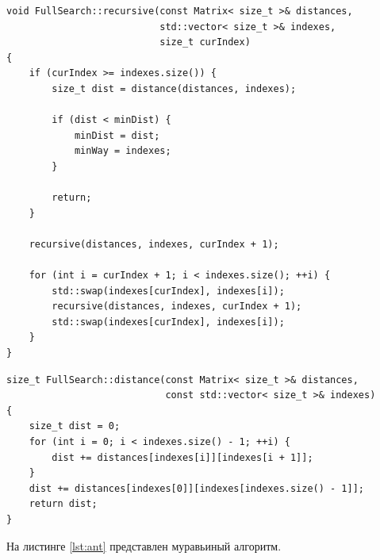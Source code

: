 \documentclass[a4paper,12pt]{article}
\begin{document}
\begin{lstlisting}[caption=Алгоритм рекурсивного перебора,label=lst:full]
void FullSearch::recursive(const Matrix< size_t >& distances,
                           std::vector< size_t >& indexes,
                           size_t curIndex)
{
    if (curIndex >= indexes.size()) {
        size_t dist = distance(distances, indexes);

        if (dist < minDist) {
            minDist = dist;
            minWay = indexes;
        }

        return;
    }

    recursive(distances, indexes, curIndex + 1);

    for (int i = curIndex + 1; i < indexes.size(); ++i) {
        std::swap(indexes[curIndex], indexes[i]);
        recursive(distances, indexes, curIndex + 1);
        std::swap(indexes[curIndex], indexes[i]);
    }
}
\end{lstlisting}

\begin{lstlisting}[caption=Подсчет пути,label=lst:dist]
size_t FullSearch::distance(const Matrix< size_t >& distances,
                            const std::vector< size_t >& indexes)
{
    size_t dist = 0;
    for (int i = 0; i < indexes.size() - 1; ++i) {
        dist += distances[indexes[i]][indexes[i + 1]];
    }
    dist += distances[indexes[0]][indexes[indexes.size() - 1]];
    return dist;
}
\end{lstlisting}

На листинге \ref{lst:ant} представлен муравьиный алгоритм.
\end{document}
